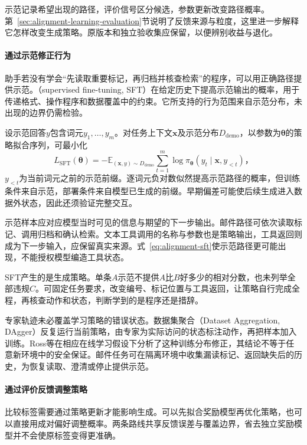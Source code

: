 示范记录希望出现的路径，评价信号区分候选，参数更新改变路径概率。第~\ref{sec:alignment-learning-evaluation}节说明了反馈来源与粒度，这里进一步解释它怎样改变生成策略。原版本和独立验收集应保留，以便辨别收益与退化。

\paragraph{通过示范修正行为}

助手若没有学会“先读取重要标记，再归档并核查检索”的程序，可以用正确路径提供示范。（supervised fine-tuning, SFT）在给定历史下提高示范输出的概率，用于传递格式、操作程序和数据覆盖中的约束。它所支持的行为范围来自示范分布，未出现的边界仍需检验。

设示范回答$y$包含词元$y_1,\ldots,y_m$。对任务上下文$\bm{x}$及示范分布$D_{\mathrm{demo}}$，以参数为$\bm\theta$的策略拟合序列，可最小化
\begin{equation}
 L_{\mathrm{SFT}}(\bm{\theta})
 =-\mathbb E_{(\bm{x},y)\sim D_{\mathrm{demo}}}
   \sum_{t=1}^{m}\log\pi_{\bm{\theta}}
          (y_t\mid\bm{x},y_{<t})\text{，}
 \label{eq:alignment-sft}
\end{equation}
$y_{<t}$为当前词元之前的示范前缀。逐词元负对数似然提高示范路径的概率，但训练条件来自示范，部署条件来自模型已生成的前缀。早期偏差可能使后续生成进入数据外状态，因此还须验证完整交互。

示范样本应对应模型当时可见的信息与期望的下一步输出。邮件路径可依次读取标记、调用归档和确认检索。文本工具调用的名称与参数也是策略输出，工具返回则成为下一步输入，应保留真实来源。式~\eqref{eq:alignment-sft}使示范路径更可能出现，不能授权模型编造工具状态。

SFT产生的是生成策略。单条$A$示范不提供$A$比$B$好多少的相对分数，也未列举全部违规$C$。可固定任务要求，改变编号、标记位置与工具返回，让策略自行完成全程，再核查动作和状态，判断学到的是程序还是措辞。

专家轨迹未必覆盖学习策略的错误状态。数据集聚合（Dataset Aggregation, DAgger）反复运行当前策略，由专家为实际访问的状态标注动作，再把样本加入训练。Ross等在相应在线学习假设下分析了这种训练分布修正，其结论不等于任意新环境中的安全保证。邮件任务可在隔离环境中收集漏读标记、返回缺失后的历史，为恢复读取、澄清或停止提供示范。

\paragraph{通过评价反馈调整策略}

比较标签需要通过策略更新才能影响生成。可以先拟合奖励模型再优化策略，也可以直接用成对偏好调整概率。两条路线共享反馈误差与覆盖边界，省去独立奖励模型并不会使原标签变得更准确。

